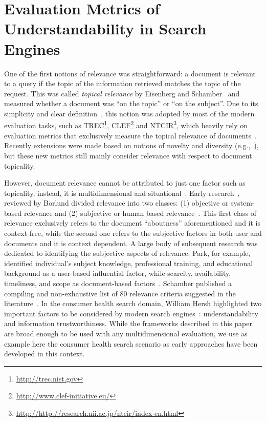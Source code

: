 
\section{Evaluation Metrics of Understandability in Search Engines}
\label{chp:evaluation_metrics}

One of the first notions of relevance was straightforward: a document is relevant to a query if the topic of the information retrieved matches the topic of the request.
This was called \textit{topical relevance} by Eisenberg and Schamber~\cite{eisenberg88} and measured whether a document was ``on the topic'' or ``on the subject''.
Due to its simplicity and clear definition~\cite{borlund03}, this notion was adopted by most of the modern evaluation tasks, such as TREC\footnote{\url{http://trec.nist.gov}}, CLEF\footnote{\url{http://www.clef-initiative.eu/}} and NTCIR\footnote{\url{http://http://research.nii.ac.jp/ntcir/index-en.html}}, which heavily rely on evaluation metrics that exclusively measure the topical relevance of documents~\cite{voorhees05}.
Recently extensions were made based on notions of novelty and diversity (e.g.,~\cite{clarke09}), but these new metrics still mainly consider relevance with respect to document topicality.

However, document relevance cannot be attributed to just one factor such as topicality, instead, it is multidimensional and situational~\cite{borlund03}.
Early research~\cite{saracevic75,swanson86,harter92}, reviewed by Borlund divided relevance into two classes: (1) objective or system-based relevance and (2) subjective or human based relevance~\cite{borlund03}. 
This first class of relevance exclusively refers to the document ``aboutness'' aforementioned and it is context-free, while the second one refers to the subjective factors in both user and documents and it is context dependent.
A large body of subsequent research was dedicated to identifying the subjective aspects of relevance.
Park, for example, identified individual's subject knowledge, professional training, and educational background as a user-based influential factor, while scarcity, availability, timeliness, and scope as document-based factors~\cite{park93}.
Schamber published a compiling and non-exhaustive list of 80 relevance criteria suggested in the literature~\cite{schamber94}.
%
In the consumer health search domain, William Hersh highlighted two important factors to be considered by modern search engines~\cite{hersh08}: understandability and information trustworthiness. 
While the frameworks described in this paper are broad enough to be used with any multidimensional evaluation, we use as example here the consumer health search scenario as early approaches have been developed in this context.

